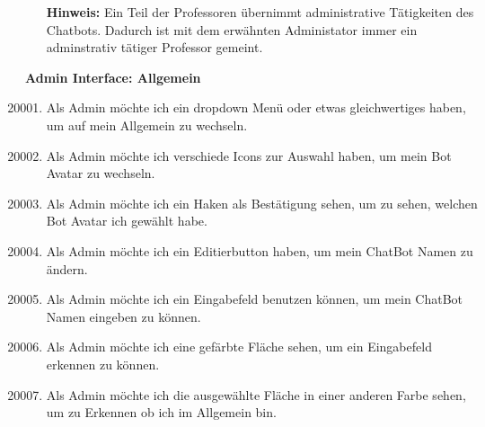 \begin{enumerate}[leftmargin=*,labelindent=40pt,label=u\arabic*.]
    \item[\textbf{Hinweis:}] Ein Teil der Professoren übernimmt administrative Tätigkeiten des Chatbots. Dadurch ist mit dem erwähnten Administator immer ein adminstrativ tätiger Professor gemeint.
\end{enumerate}
\newpage
\textbf{Admin Interface: Allgemein}
\begin{enumerate}[leftmargin=*,labelindent=40pt,label=u\arabic*.]
    \setcounter{enumi}{20000}
    \item Als Admin möchte ich ein dropdown Menü oder etwas gleichwertiges haben, um auf mein Allgemein zu wechseln.
    \item Als Admin möchte ich verschiede Icons zur Auswahl haben, um mein Bot Avatar zu wechseln.
    \item Als Admin möchte ich ein Haken als Bestätigung sehen, um zu sehen, welchen Bot Avatar ich gewählt habe.
    \item Als Admin möchte ich ein Editierbutton haben, um mein ChatBot Namen zu ändern.
    \item Als Admin möchte ich ein Eingabefeld benutzen können, um mein ChatBot Namen eingeben zu können.
    \item Als Admin möchte ich eine gefärbte Fläche sehen, um ein Eingabefeld erkennen zu können.
    \item Als Admin möchte ich die ausgewählte Fläche in einer anderen Farbe sehen, um zu Erkennen ob ich im Allgemein bin.
\end{enumerate}

